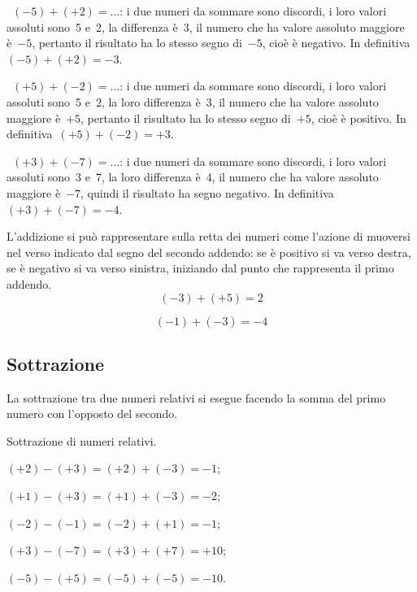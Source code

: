 \begin{exrig}
 \begin{esempio}
~$(-5)+(+2)=\ldots$: i due numeri da sommare sono discordi, i loro valori assoluti sono~5 e~2, la differenza è~3,
il numero che ha valore assoluto maggiore è~$-5$, pertanto il risultato ha lo stesso segno di~$-5$, cioè è negativo.
In definitiva~$(-5)+(+2)=-3$.
 \end{esempio}

 \begin{esempio}
~$(+5)+(-2)=\ldots$: i due numeri da sommare sono discordi, i loro valori assoluti sono~5 e~2, la loro differenza è~3,
il numero che ha valore assoluto maggiore è~$+5$, pertanto il risultato ha lo stesso segno di~$+5$,
cioè è positivo. In definitiva~$(+5)+(-2)=+3$.
 \end{esempio}

 \begin{esempio}
~$(+3)+(-7)=\ldots$: i due numeri da sommare sono discordi, i loro valori assoluti sono~3 e~7, la loro differenza è~4,
il numero che ha valore assoluto maggiore è~$-7$, quindi il risultato ha segno negativo.
In definitiva~$(+3)+(-7)=-4$.
 \end{esempio}
\end{exrig}

L'addizione si può rappresentare sulla retta dei numeri come l'azione di muoversi nel verso indicato dal segno del
secondo addendo: se è positivo si va verso destra, se è negativo si va verso sinistra, iniziando dal punto che
rappresenta il primo addendo.
 \[(-3)+(+5)=2\]
\begin{center}
 
\end{center}

\[ (-1)+(-3) = -4\]
\begin{center}
 
\end{center}

\ovalbox{\risolvii \ref{ese:2.6}, \ref{ese:2.7}, \ref{ese:2.8}}
\subsection{Sottrazione}

La sottrazione tra due numeri relativi si esegue facendo la somma del primo numero con l'opposto del secondo.

\begin{exrig}
 \begin{esempio}
 Sottrazione di numeri relativi.
 \begin{enumeratea}
 \item $(+2)-(+3)=(+2)+(-3)=-1$;
\item $(+1)-(+3)=(+1)+(-3)=-2$;
\item $(-2)-(-1)=(-2)+(+1)=-1$;
\item $(+3)-(-7)=(+3)+(+7)=+10$;
\item $(-5)-(+5)=(-5)+(-5)=-10$.
 \end{enumeratea}
 \end{esempio}
\end{exrig}

